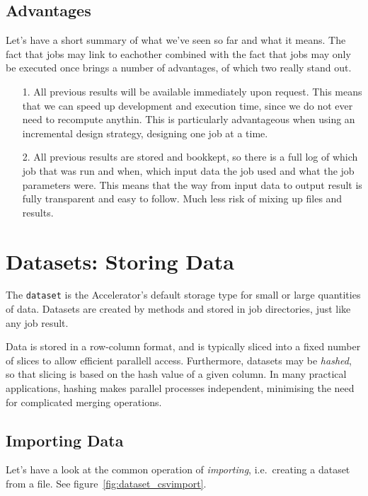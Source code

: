 \documentclass[a4paper]{article}
\begin{document}
\subsection{Advantages}
Let's have a short summary of what we've seen so far and what it
means.  The fact that jobs may link to eachother combined with the
fact that jobs may only be executed once brings a number of
advantages, of which two really stand out.
\begin{itemize}
\item[1.] All previous results will be available immediately upon
  request.  This means that we can speed up development and execution
  time, since we do not ever need to recompute anythin.  This is
  particularly advantageous when using an incremental design strategy,
  designing one job at a time.
\item[2.] All previous results are stored and bookkept, so there is a
  full log of which job that was run and when, which input data the
  job used and what the job parameters were.  This means that the way
  from input data to output result is fully transparent and easy to
  follow.  Much less risk of mixing up files and results.
\end{itemize}

\clearpage





\section{Datasets: Storing Data}

The \texttt{dataset} is the Accelerator's default storage type for
small or large quantities of data.  Datasets are created by methods
and stored in job directories, just like any job result.

Data is stored in a row-column format, and is typically sliced into a
fixed number of slices to allow efficient parallell access.
Furthermore, datasets may be \textsl{hashed}, so that slicing is based
on the hash value of a given column.  In many practical applications,
hashing makes parallel processes independent, minimising the need for
complicated merging operations.



\subsection{Importing Data}

Let's have a look at the common operation of \textsl{importing},
i.e.\ creating a dataset from a file.  See
figure~\ref{fig:dataset_csvimport}.
\end{document}
